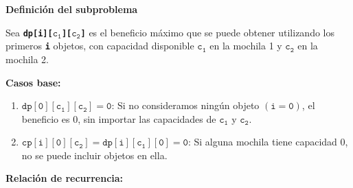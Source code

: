 \begin{enumerate}[label=\color{red}\textbf{\arabic*)}]
    \textbf{Definición del subproblema} 

    Sea \textbf{\texttt{dp[i][$\mathtt{c_1}$][$\mathtt{c_2}$]}} es el beneficio máximo que se puede obtener utilizando los primeros \textbf{\texttt{i}} objetos, con capacidad disponible $\mathbf{\mathtt{c_1}}$ en la mochila 1 y $\mathbf{\mathtt{c_2}}$ en la mochila 2.

    \textbf{Casos base:}
    \begin{enumerate}[label=\arabic*)]
      \item $\mathbf{\mathtt{dp[0][c_1][c_2]=0}}$: Si no consideramos ningún objeto $(\mathbf{\mathtt{i=0}})$, el beneficio es $0$, sin importar las capacidades de $\mathbf{\mathtt{c_1}}$ y $\mathbf{\mathtt{c_2}}$.
      \item $\mathbf{\mathtt{cp[i][0][c_2]=dp[i][c_1][0]=0}}$: Si alguna mochila tiene capacidad $0$, no se puede incluir objetos en ella.
    \end{enumerate}
    \textbf{Relación de recurrencia:}


\end{enumerate}
